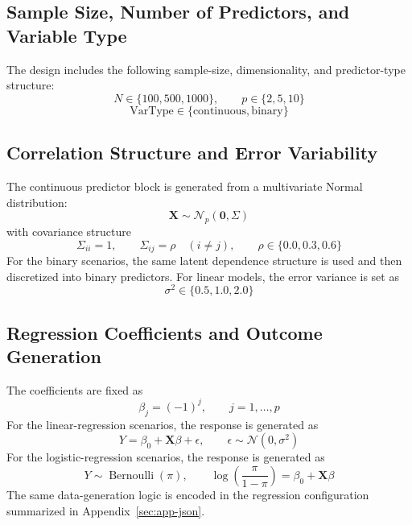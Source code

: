 \subsection{Sample Size, Number of Predictors, and Variable Type}
The design includes the following sample-size, dimensionality, and predictor-type structure:
\begin{equation}
N \in \{100, 500, 1000\}, \qquad p \in \{2, 5, 10\}
\end{equation}
\begin{equation}
\text{VarType} \in \{\text{continuous}, \text{binary}\}
\end{equation}

\subsection{Correlation Structure and Error Variability}
The continuous predictor block is generated from a multivariate Normal distribution:
\begin{equation}
\mathbf{X} \sim \mathcal{N}_p(\mathbf{0}, \Sigma)
\end{equation}
with covariance structure
\begin{equation}
\Sigma_{ii} = 1, \qquad \Sigma_{ij} = \rho \quad (i \neq j), \qquad \rho \in \{0.0, 0.3, 0.6\}
\end{equation}
For the binary scenarios, the same latent dependence structure is used and then discretized into binary predictors. For linear models, the error variance is set as
\begin{equation}
\sigma^2 \in \{0.5, 1.0, 2.0\}
\end{equation}

\subsection{Regression Coefficients and Outcome Generation}
The coefficients are fixed as
\begin{equation}
\beta_j = (-1)^j, \qquad j = 1, \dots, p
\end{equation}
For the linear-regression scenarios, the response is generated as
\begin{equation}
Y = \beta_0 + \mathbf{X}\beta + \epsilon, \qquad \epsilon \sim \mathcal{N}(0, \sigma^2)
\end{equation}
For the logistic-regression scenarios, the response is generated as
\begin{equation}
Y \sim \operatorname{Bernoulli}(\pi), \qquad \log\left(\frac{\pi}{1-\pi}\right) = \beta_0 + \mathbf{X}\beta
\end{equation}
The same data-generation logic is encoded in the regression configuration summarized in Appendix~\ref{sec:app-json}.

